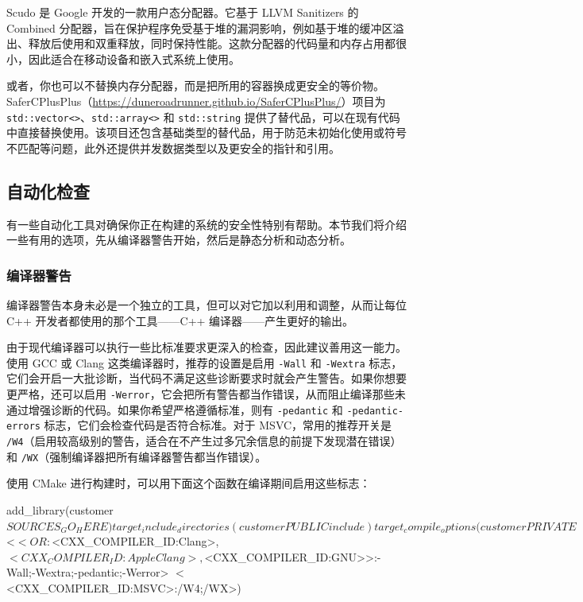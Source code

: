 Scudo 是 Google 开发的一款用户态分配器。它基于 LLVM Sanitizers 的 Combined 分配器，旨在保护程序免受基于堆的漏洞影响，例如基于堆的缓冲区溢出、释放后使用和双重释放，同时保持性能。这款分配器的代码量和内存占用都很小，因此适合在移动设备和嵌入式系统上使用。

\label{idx:1068}
\label{idx:1069}
或者，你也可以不替换内存分配器，而是把所用的容器换成更安全的等价物。SaferCPlusPlus（\href{https://duneroadrunner.github.io/SaferCPlusPlus/}{https://duneroadrunner.github.io/SaferCPlusPlus/}）项目为 \texttt{std::\allowbreak{}vector<>}、\texttt{std::\allowbreak{}array<>} 和 \texttt{std::\allowbreak{}string} 提供了替代品，可以在现有代码中直接替换使用。该项目还包含基础类型的替代品，用于防范未初始化使用或符号不匹配等问题，此外还提供并发数据类型以及更安全的指针和引用。

\subsection{自动化检查}

\label{idx:1070}
有一些自动化工具对确保你正在构建的系统的安全性特别有帮助。本节我们将介绍一些有用的选项，先从编译器警告开始，然后是静态分析和动态分析。

\subsubsection{编译器警告}

编译器警告本身未必是一个独立的工具，但可以对它加以利用和调整，从而让每位 C++ 开发者都使用的那个工具——C++ 编译器——产生更好的输出。

\label{idx:1071}
由于现代编译器可以执行一些比标准要求更深入的检查，因此建议善用这一能力。使用 GCC 或 Clang 这类编译器时，推荐的设置是启用 \texttt{-Wall} 和 \texttt{-Wextra} 标志，它们会开启一大批诊断，当代码不满足这些诊断要求时就会产生警告。如果你想要更严格，还可以启用 \texttt{-Werror}，它会把所有警告都当作错误，从而阻止编译那些未通过增强诊断的代码。如果你希望严格遵循标准，则有 \texttt{-pedantic} 和 \texttt{-pedantic-errors} 标志，它们会检查代码是否符合标准。对于 MSVC，常用的推荐开关是 \texttt{/W4}（启用较高级别的警告，适合在不产生过多冗余信息的前提下发现潜在错误）和 \texttt{/WX}（强制编译器把所有编译器警告都当作错误）。

使用 CMake 进行构建时，可以用下面这个函数在编译期间启用这些标志：

\begin{codebox}[cmake]
add_library(customer ${SOURCES_GO_HERE})
target_include_directories(customer PUBLIC include)
target_compile_options(customer PRIVATE
    $<$<OR:$<CXX_COMPILER_ID:Clang>,$<CXX_COMPILER_ID:AppleClang>,$<CXX_COMPILER_ID:GNU>>:-Wall;-Wextra;-pedantic;-Werror>
    $<$<CXX_COMPILER_ID:MSVC>:/W4;/WX>)
\end{codebox}

